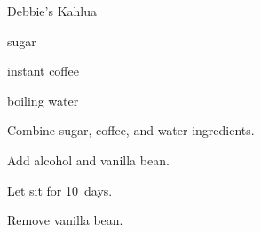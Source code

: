 \begin{recipe}{Debbie's Kahlua}{}{}

\begin{ingredients}
\item {} sugar
\item {} instant coffee
\item {} boiling water
\item {} 
\end{ingredients}

\begin{directions}
\item Combine sugar, coffee, and water ingredients.
\item Add alcohol and vanilla bean.
\item Let sit for 10~days.
\item Remove vanilla bean.
\end{directions}

\end{recipe}
